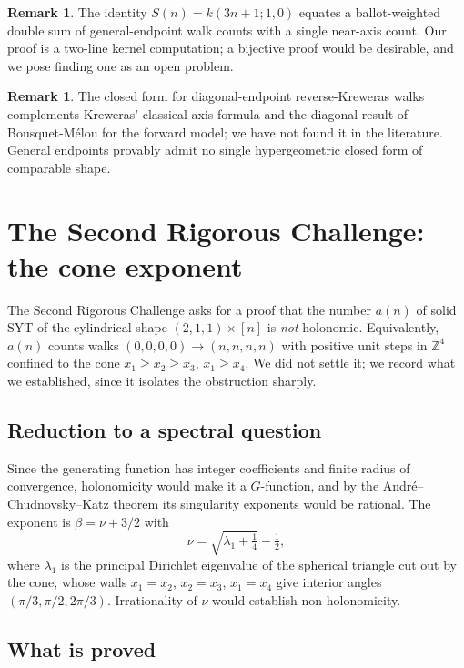 \documentclass[11pt]{article}
\theoremstyle{definition}
\newtheorem{remark}[theorem]{Remark}
\begin{document}
\begin{remark}
The identity $S(n)=k(3n+1;1,0)$ equates a ballot-weighted double sum of
general-endpoint walk counts with a single near-axis count. Our proof is a
two-line kernel computation; a bijective proof would be desirable, and we pose
finding one as an open problem.
\end{remark}

\begin{remark}
The closed form for diagonal-endpoint reverse-Kreweras walks complements
Kreweras' classical axis formula and the diagonal result of
Bousquet-M\'elou \cite[Thm.~2]{BM05} for the forward model; we have not found
it in the literature.
General endpoints provably admit no single hypergeometric closed form of
comparable shape.
\end{remark}

\section{The Second Rigorous Challenge: the cone exponent}\label{sec:cone}

The Second Rigorous Challenge asks for a proof that the number $a(n)$ of solid
SYT of the cylindrical shape $(2,1,1)\times[n]$ is \emph{not} holonomic.
Equivalently, $a(n)$ counts walks $(0,0,0,0)\to(n,n,n,n)$ with positive unit
steps in $\mathbb{Z}^{4}$ confined to the cone $x_1\ge x_2\ge x_3$,
$x_1\ge x_4$. We did not settle it; we record what we established, since it
isolates the obstruction sharply.

\subsection{Reduction to a spectral question}

Since the generating function has integer coefficients and finite radius of
convergence, holonomicity would make it a $G$-function, and by the
Andr\'e--Chudnovsky--Katz theorem its singularity exponents would be rational.
The exponent is $\beta=\nu+3/2$ with
\[
  \nu=\sqrt{\lambda_1+\tfrac14}-\tfrac12,
\]
where $\lambda_1$ is the principal Dirichlet eigenvalue of the spherical
triangle cut out by the cone, whose walls $x_1=x_2$, $x_2=x_3$, $x_1=x_4$ give
interior angles $(\pi/3,\pi/2,2\pi/3)$. Irrationality of $\nu$ would establish
non-holonomicity.

\subsection{What is proved}
\end{document}
